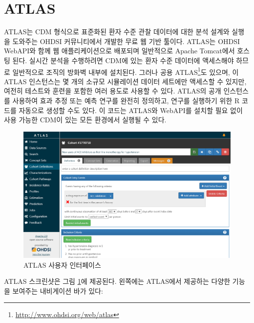 \documentclass[10.5pt]{book}
\let\rmarkdownfootnote\footnote%
\def\footnote{\protect\rmarkdownfootnote}
\theoremstyle{definition}
\theoremstyle{definition}
\theoremstyle{definition}
\theoremstyle{remark}
\begin{document}
\section{ATLAS}\label{atlas}

ATLAS는 CDM 형식으로 표준화된 환자 수준 관찰 데이터에 대한 분석 설계와
실행을 도와주는 OHDSI 커뮤니티에서 개발한 무료 웹 기반 툴이다. ATLAS는
OHDSI WebAPI와 함께 웹 애플리케이션으로 배포되며 일반적으로 Apache
Tomcat에서 호스팅 된다. 실시간 분석을 수행하려면 CDM에 있는 환자 수준
데이터에 액세스해야 하므로 일반적으로 조직의 방화벽 내부에 설치된다.
그러나 공용 ATLAS\footnote{\url{http://www.ohdsi.org/web/atlas}}도
있으며, 이 ATLAS 인스턴스는 몇 개의 소규모 시뮬레이션 데이터 세트에만
액세스할 수 있지만, 여전히 테스트와 훈련을 포함한 여러 용도로 사용할 수
있다. ATLAS의 공개 인스턴스를 사용하여 효과 추정 또는 예측 연구를 완전히
정의하고, 연구를 실행하기 위한 R 코드를 자동으로 생성할 수도 있다. 이
코드는 ATLAS와 WebAPI를 설치할 필요 없이 사용 가능한 CDM이 있는 모든
환경에서 실행될 수 있다. 

\begin{figure}

{\centering \includegraphics[width=1\linewidth]{images/OhdsiAnalyticsTools/atlas} 

}

\caption{ATLAS 사용자 인터페이스}\label{fig:atlas}
\end{figure}

ATLAS 스크린샷은 그림 \ref{fig:atlas}에 제공된다. 왼쪽에는 ATLAS에서
제공하는 다양한 기능을 보여주는 내비게이션 바가 있다:
\end{document}
